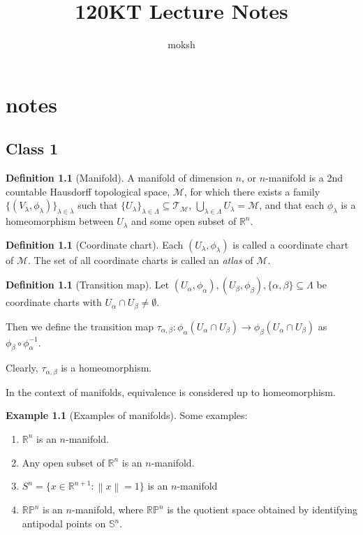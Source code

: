 \documentclass[12pt]{report}
\title{120KT Lecture Notes}
\author{moksh}
\theoremstyle{definition}
\newtheorem{example}[thm]{Example}
\newtheorem{defn}[thm]{Definition}
\newcommand{\bb}[1]{\mathbb{#1}}
\renewcommand{\cal}[1]{\mathcal{#1}}
\newcommand{\norm}[1]{\left\lVert#1\right\rVert}
\begin{document}
\maketitle
\chapter{notes}
\section{Class 1}
\begin{defn}[Manifold]
A manifold of dimension $n$, or $n$-manifold is a 2nd countable Hausdorff topological space, $\cal{M}$, for which there exists a family $\{(V_{\lambda}, \phi_{\lambda})\}_{\lambda \in \lambda}$ such that $\{U_{\lambda}\}_{\lambda \in \Lambda} \subseteq \cal{T}_{\cal{M}}$, $\bigcup_{\lambda \in \Lambda} U_{\lambda} = \cal{M}$, and that each $\phi_{\lambda}$ is a homeomorphism between $U_{\lambda}$ and some open subset of $\bb{R}^n$.
\end{defn}

\begin{defn}[Coordinate chart]
Each $(U_{\lambda}, \phi_{\lambda})$ is called a coordinate chart of $\cal{M}$. 
The set of all coordinate charts is called an \emph{atlas} of $\cal{M}$.
\end{defn}

\begin{defn}[Transition map]
Let $(U_\alpha, \phi_\alpha), (U_\beta, \phi_\beta), \{\alpha, \beta\}\subseteq \Lambda$ be coordinate charts with $U_{\alpha} \cap U_{\beta} \neq \emptyset$.
 
Then we define the transition map $\tau_{\alpha, \beta}: \phi_{\alpha}(U_{\alpha} \cap U_{\beta}) \to \phi_{\beta}(U_{\alpha} \cap U_{\beta})$ as $\phi_{\beta} \circ \phi_{\alpha}^{-1}$.
\end{defn}
Clearly, $\tau_{\alpha, \beta}$ is a homeomorphism.

In the context of manifolds, equivalence is considered up to homeomorphism.


\begin{example}[Examples of manifolds]
Some examples:

\begin{enumerate}
\item $\bb{R}^n$ is an $n$-manifold.
\item Any open subset of $\bb{R}^n$ is an $n$-manifold.
\item $S^n = \{x \in \bb{R}^{n+1} : \norm{x} = 1\}$ is an $n$-manifold 
\item $\bb{RP}^n$ is an $n$-manifold, where $\bb{RP}^n$ is the quotient space obtained by identifying antipodal points on $\bb{S}^n$.
\end{enumerate}
\end{example}
\end{document}
